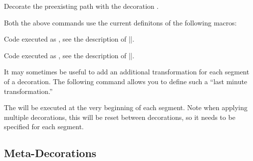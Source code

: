\begin{command}{\pgfdecoratecurrentpath{}}
  Decorate the preexisting path with the decoration .
\end{command}

Both the above commands use the current definitons of the following
macros:

\begin{command}{\pgfdecoratebeforecode}
  Code executed as , see the description of
  |\pgfdecorate|. 
\end{command}

\begin{command}{\pgfdecorateaftercode}
  Code executed as , see the description of
  |\pgfdecorate|. 
\end{command}

It may sometimes be useful to add an additional transformation
for each segment of a decoration. The following command allows 
you to define such a ``last minute transformation.''

\begin{command}{\pgfsetdecorationsegmenttransformation{}}
  The  will be executed at the very beginning of each
  segment. Note when applying multiple decorations, this will
  be reset between decorations, so it needs to be specified for
  each segment.

\begin{codeexample}[]
\end{codeexample}
\end{command}




\subsection{Meta-Decorations}

